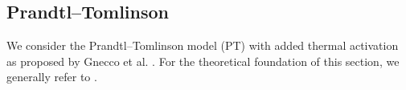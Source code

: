 \subsection{Prandtl–Tomlinson} %
We consider the Prandtl–Tomlinson model (\acrshort{PT}) with added thermal activation as proposed by Gnecco et al. \cite{PhysRevLett.84.1172}. For the theoretical foundation of this section, we generally refer to \cite{Yalin_2011}.




